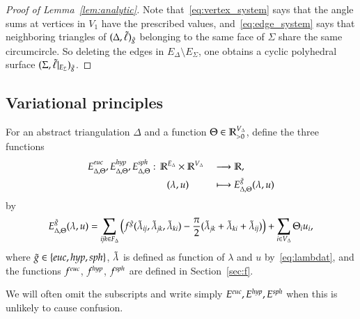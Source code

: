 \documentclass[Thesis]{subfiles}
\begin{document}
\begin{proof}[Proof of Lemma~\ref{lem:analytic}]
  Note that~\eqref{eq:vertex_system} says that the angle sums at
  vertices in $V_{1}$ have the prescribed values,
  and~\eqref{eq:edge_system} says that neighboring triangles of
  $(\Delta,\tilde{\ell})_{\tilde{g}}$ belonging to the same face of $\Sigma$ share
  the same circumcircle. So deleting the edges in $E_{\Delta}\setminus
  E_{\Sigma}$, one obtains a cyclic polyhedral surface
  $(\Sigma,\tilde{\ell}|_{E_{\Sigma}})_{\tilde{g}}$.
\end{proof}

\subsection{Variational principles}
\label{sec:variational}

\begin{definition}
  \label{def:E}
  For an abstract triangulation $\Delta$ and a function
  $\Theta\in\mathbb R_{>0}^{V_{\Delta}}$, define the three functions
  \begin{alignat*}{2}
      E_{\Delta,\Theta}^{\euc},E_{\Delta,\Theta}^{\hyp},E_{\Delta,\Theta}^{\sph}:\,
      \R^{E_{\Delta}}&\times\R^{V_{\Delta}}&&\longrightarrow\R,\\
      (\lambda&, u)&&\longmapsto E_{\Delta,\Theta}^{\gt}(\lambda, u)
  \end{alignat*}
  by
  \begin{equation}
      \label{eq:E}
      E_{\Delta,\Theta}^{\tilde{g}}(\lambda, u) 
      = \sum_{{\it ijk}\in F_{\Delta}}\big(f^{\tilde{g}}(\tilde{\lambda}_{\it ij},\tilde{\lambda}_{\it jk},\tilde{\lambda}_{\it ki}) -
      \frac{\pi}{2}(\tilde{\lambda}_{\it jk} + \tilde{\lambda}_{\it ki} +
      \tilde{\lambda}_{\it ij})\big) + \sum_{i\in V_{\Delta}} \Theta_i u_i,    
  \end{equation}
  where $\gt\in\{\euc,\hyp,\sph\}$, $\tilde{\lambda}$ is defined as function
  of $\lambda$ and $u$ by~\eqref{eq:lambdat}, and the functions
  $f^{\euc}$, $f^{\mathit{hyp}}$, $f^{\mathit{sph}}$ are defined in Section~\ref{sec:f}.
\end{definition}

We will often omit the subscripts and write simply
$E^{\euc},E^{\hyp},E^{\sph}$ when this is unlikely to cause confusion.
\end{document}
